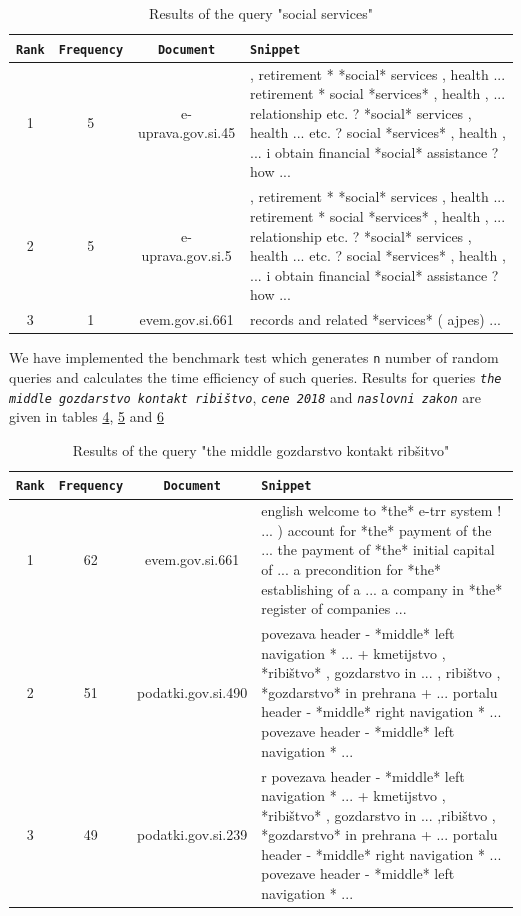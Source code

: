 \documentclass{article}
\begin{document}
	\begin{table}[!hbt]
		\centering
		\begin{tabularx}{\textwidth}{c|c|c|X}
			\texttt{Rank} & \texttt{Frequency} & \texttt{Document} & \texttt{Snippet}  \\ \hline
			1& 5 & e-uprava.gov.si.45 & , retirement * *social* services , health ... retirement * social *services* , health , ...          relationship etc. ? *social* services , health ... etc. ? social *services* , health , ... i obtain financial *social* assistance ? how ...  \\ \hline
			2& 5 & e-uprava.gov.si.5 & , retirement * *social* services , health ... retirement * social *services* , health , ... relationship etc. ? *social* services , health ... etc. ? social *services* , health , ... i obtain financial *social* assistance ? how ... \\ \hline
			3 & 1 & evem.gov.si.661 & records and related *services* ( ajpes) ...  
		\end{tabularx}
		\caption{Results of the query "social services"}
		\label{tab:3}
	\end{table}{}
	
	We have implemented the benchmark test which generates \texttt{n} number of random queries and calculates the time efficiency of such queries. Results for queries \texttt{\textit{the middle gozdarstvo kontakt ribištvo}}, \texttt{\textit{cene 2018}} and \texttt{\textit{naslovni zakon}} are given in tables \hyperref[tab:4]{4}, \hyperref[tab:5]{5} and \hyperref[tab:6]{6}  
	
	\begin{table}[!hbt]
		\centering
		\begin{tabularx}{\textwidth}{c|c|c|X}
			\texttt{Rank} & \texttt{Frequency} & \texttt{Document} & \texttt{Snippet}  \\ \hline
			1& 62 & evem.gov.si.661 & english welcome to *the* e-trr system ! ... ) account for *the* payment of the ... the payment of *the* initial capital of ... a precondition for *the* establishing of a ... a company in *the* register of companies ...  \\ \hline
			2& 51 & podatki.gov.si.490 & povezava header - *middle* left navigation * ... + kmetijstvo , *ribištvo* , gozdarstvo in ... , ribištvo , *gozdarstvo* in prehrana + ... portalu header - *middle* right navigation * ... povezave header - *middle* left navigation * ...  \\ \hline
			3 & 49 & podatki.gov.si.239 & r povezava header - *middle* left navigation * ... + kmetijstvo , *ribištvo* , gozdarstvo in ... ,ribištvo , *gozdarstvo* in prehrana + ... portalu header - *middle* right navigation * ... povezave  header - *middle* left navigation * ...
		\end{tabularx}
		\caption{Results of the query "the middle gozdarstvo kontakt ribšitvo"}
		\label{tab:4}
	\end{table}{}
	
\end{document}
